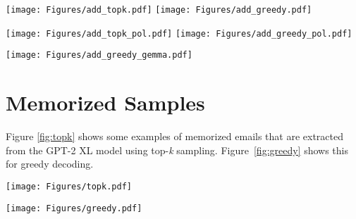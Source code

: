 \begin{figure*}[t!]
  \texttt{[image: Figures/add\_topk.pdf]} \hfill
  \texttt{[image: Figures/add\_greedy.pdf]}
  \caption {Adding more PII leads to more extraction in GPT-2 XL trained on WikiText + Enron emails for both top-\emph{k} sampling (left) and greedy decoding (right).}
  \label{fig:add_xl}
\end{figure*}

\begin{figure*}[t!]
  \texttt{[image: Figures/add\_topk\_pol.pdf]} \hfill
  \texttt{[image: Figures/add\_greedy\_pol.pdf]}
  \caption {Adding more PII leads to more extraction in GPT-2 XL trained on the Pile of Law + Enron emails for both top-\emph{k} sampling (left) and greedy decoding (right).}
  \label{fig:add_pol}
\end{figure*}

\begin{figure*}[t!]
  \texttt{[image: Figures/add\_greedy\_gemma.pdf]} \hfill
  \caption {Adding more PII leads to more extraction in Gemma 2B trained on WikiText + Enron emails. The results are for greedy decoding.}
  \label{fig:add_gemma}
\end{figure*}

\FloatBarrier


\section{Memorized Samples}
Figure \ref{fig:topk} shows some examples of memorized emails that are extracted from the GPT-2 XL model using top-\emph{k} sampling. Figure~\ref{fig:greedy} shows this for greedy decoding.  


\FloatBarrier








\begin{figure*}[t]
  \texttt{[image: Figures/topk.pdf]}  
  \caption {Emails extracted using top-\emph{k} sampling from the GPT-2 XL model. \textbf{Generation}: a subset of tokens that fall in the vicinity of memorized emails are selected from 256 tokens for demonstration purposes. Emails in red are extracted from training data. Emails in green indicate they don't belong to our training data. \textbf{Org} denotes the company/organization that memorized email addresses belong to.}
  \label{fig:topk}
\end{figure*}

\begin{figure*}[t]
  \texttt{[image: Figures/greedy.pdf]}  
  \caption {Emails extracted using greedy decoding for the GPT-2 XL model. \textbf{Generation}: a subset of tokens that fall in the vicinity of memorized emails are selected from 256 tokens for demonstration purposes. Emails in red are extracted from training data. Emails in green indicate they don't belong to our training data. \textbf{Org} denotes the company/organization that memorized email addresses belong to.}
  \label{fig:greedy}
\end{figure*}

